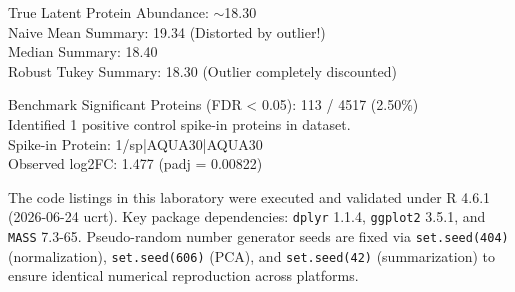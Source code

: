 \documentclass[11pt,oneside]{book}
\begin{document}
\begin{routput}
True Latent Protein Abundance: $\sim$18.30\\
\hspace*{2em}Naive Mean Summary:   19.34 (Distorted by outlier!)\\
\hspace*{2em}Median Summary:       18.40\\
\hspace*{2em}Robust Tukey Summary: 18.30 (Outlier completely discounted)
\end{routput}


\begin{routput}
Benchmark Significant Proteins (FDR < 0.05): 113 / 4517 (2.50\%)\\
Identified 1 positive control spike-in proteins in dataset.\\
\hspace*{2em}Spike-in Protein: 1/sp|AQUA30|AQUA30\\
\hspace*{2em}Observed log2FC: 1.477 (padj = 0.00822)
\end{routput}

\begin{notebox}[top=3pt, bottom=3pt, before skip=3pt, after skip=3pt, title={Computational Environment and Reproducibility Parameters}]
\small
The code listings in this laboratory were executed and validated under R 4.6.1 (2026-06-24 ucrt). Key package dependencies: \texttt{dplyr} 1.1.4, \texttt{ggplot2} 3.5.1, and \texttt{MASS} 7.3-65. Pseudo-random number generator seeds are fixed via \texttt{set.seed(404)} (normalization), \texttt{set.seed(606)} (PCA), and \texttt{set.seed(42)} (summarization) to ensure identical numerical reproduction across platforms.
\end{notebox}
\end{document}
